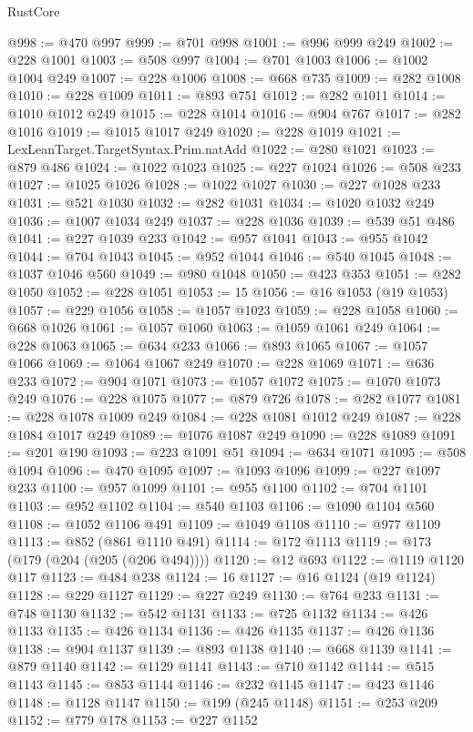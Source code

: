 \begin{lexlean}{RustCore}
\begin{coremodule}
@998 := @470 @997
@999 := @701 @998
@1001 := @996 @999 @249
@1002 := @228 @1001
@1003 := @508 @997
@1004 := @701 @1003
@1006 := @1002 @1004 @249
@1007 := @228 @1006
@1008 := @668 @735
@1009 := @282 @1008
@1010 := @228 @1009
@1011 := @893 @751
@1012 := @282 @1011
@1014 := @1010 @1012 @249
@1015 := @228 @1014
@1016 := @904 @767
@1017 := @282 @1016
@1019 := @1015 @1017 @249
@1020 := @228 @1019
@1021 := LexLeanTarget.TargetSyntax.Prim.natAdd
@1022 := @280 @1021
@1023 := @879 @486
@1024 := @1022 @1023
@1025 := @227 @1024
@1026 := @508 @233
@1027 := @1025 @1026
@1028 := @1022 @1027
@1030 := @227 @1028 @233
@1031 := @521 @1030
@1032 := @282 @1031
@1034 := @1020 @1032 @249
@1036 := @1007 @1034 @249
@1037 := @228 @1036
@1039 := @539 @51 @486
@1041 := @227 @1039 @233
@1042 := @957 @1041
@1043 := @955 @1042
@1044 := @704 @1043
@1045 := @952 @1044
@1046 := @540 @1045
@1048 := @1037 @1046 @560
@1049 := @980 @1048
@1050 := @423 @353
@1051 := @282 @1050
@1052 := @228 @1051
@1053 := 15
@1056 := @16 @1053 (@19 @1053)
@1057 := @229 @1056
@1058 := @1057 @1023
@1059 := @228 @1058
@1060 := @668 @1026
@1061 := @1057 @1060
@1063 := @1059 @1061 @249
@1064 := @228 @1063
@1065 := @634 @233
@1066 := @893 @1065
@1067 := @1057 @1066
@1069 := @1064 @1067 @249
@1070 := @228 @1069
@1071 := @636 @233
@1072 := @904 @1071
@1073 := @1057 @1072
@1075 := @1070 @1073 @249
@1076 := @228 @1075
@1077 := @879 @726
@1078 := @282 @1077
@1081 := @228 @1078 @1009 @249
@1084 := @228 @1081 @1012 @249
@1087 := @228 @1084 @1017 @249
@1089 := @1076 @1087 @249
@1090 := @228 @1089
@1091 := @201 @190
@1093 := @223 @1091 @51
@1094 := @634 @1071
@1095 := @508 @1094
@1096 := @470 @1095
@1097 := @1093 @1096
@1099 := @227 @1097 @233
@1100 := @957 @1099
@1101 := @955 @1100
@1102 := @704 @1101
@1103 := @952 @1102
@1104 := @540 @1103
@1106 := @1090 @1104 @560
@1108 := @1052 @1106 @491
@1109 := @1049 @1108
@1110 := @977 @1109
@1113 := @852 (@861 @1110 @491)
@1114 := @172 @1113
@1119 := @173 (@179 (@204 (@205 (@206 @494))))
@1120 := @12 @693
@1122 := @1119 @1120 @117
@1123 := @484 @238
@1124 := 16
@1127 := @16 @1124 (@19 @1124)
@1128 := @229 @1127
@1129 := @227 @249
@1130 := @764 @233
@1131 := @748 @1130
@1132 := @542 @1131
@1133 := @725 @1132
@1134 := @426 @1133
@1135 := @426 @1134
@1136 := @426 @1135
@1137 := @426 @1136
@1138 := @904 @1137
@1139 := @893 @1138
@1140 := @668 @1139
@1141 := @879 @1140
@1142 := @1129 @1141
@1143 := @710 @1142
@1144 := @515 @1143
@1145 := @853 @1144
@1146 := @232 @1145
@1147 := @423 @1146
@1148 := @1128 @1147
@1150 := @199 (@245 @1148)
@1151 := @253 @209
@1152 := @779 @178
@1153 := @227 @1152

\end{coremodule}
\end{lexlean}
